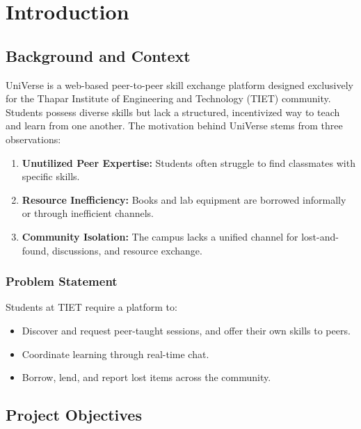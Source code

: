 \documentclass{tietreport}
\author{%
  \texttt{1024030215} Sehajneet Kaur \\
  \texttt{1024030711} Raynee Jindal \\
  \texttt{1024030247} Sahejbir Singh \\
  \texttt{1024030649} Shaurya Ranjan%
}
\begin{document}
\maketitle

\tableofcontents


\chapter{Introduction}

\section{Background and Context}

UniVerse is a web-based peer-to-peer skill exchange platform designed exclusively for the Thapar Institute of Engineering and Technology (TIET) community. Students possess diverse skills but lack a structured, incentivized way to teach and learn from one another. The motivation behind UniVerse stems from three observations:

\begin{enumerate}
  \item \textbf{Unutilized Peer Expertise:} Students often struggle to find classmates with specific skills.
  \item \textbf{Resource Inefficiency:} Books and lab equipment are borrowed informally or through inefficient channels.
  \item \textbf{Community Isolation:} The campus lacks a unified channel for lost-and-found, discussions, and resource exchange.
\end{enumerate}

\subsection{Problem Statement}

Students at TIET require a platform to:

\begin{itemize}
  \item Discover and request peer-taught sessions, and offer their own skills to peers.
  \item Coordinate learning through real-time chat.
  \item Borrow, lend, and report lost items across the community.
\end{itemize}

\section{Project Objectives}
\end{document}
